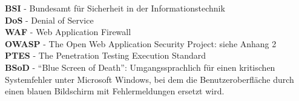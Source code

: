 \documentclass[12pt,oneside,a4paper,parskip]{scrbook}
\begin{document}
  \textbf{BSI} - Bundesamt für Sicherheit in der Informationstechnik\\

  \textbf{DoS} - Denial of Service\\

  \textbf{WAF} - Web Application Firewall\\

  \textbf{OWASP} - The Open Web Application Security Project: siehe Anhang 2\\

  \textbf{PTES} - The Penetration Testing Execution Standard\\

  \textbf{BSoD} - ``Blue Screen of Death'': Umgangssprachlich für einen kritischen Systemfehler unter Microsoft Windows, bei dem die Benutzeroberfläche durch einen blauen Bildschirm mit Fehlermeldungen ersetzt wird.\\
  \newpage
\end{document}
